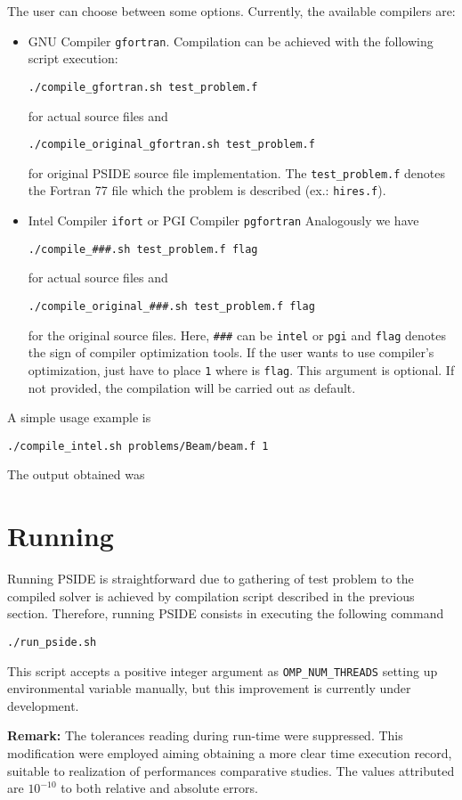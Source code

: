 \documentclass[a4paper,11pt]{article}
\theoremstyle{comm}
\begin{document}
The user can choose between some options. Currently, the available compilers are:
\begin{itemize}
\item GNU Compiler \texttt{gfortran}. Compilation can be achieved with the following script execution:

\begin{Verbatim}[frame=single]
./compile_gfortran.sh test_problem.f
\end{Verbatim}
for actual source files and
\begin{Verbatim}[frame=single]
./compile_original_gfortran.sh test_problem.f
\end{Verbatim}
for original PSIDE source file implementation. The \texttt{test\_problem.f} denotes the Fortran 77 file which the problem is described (ex.: \texttt{hires.f}).

\item Intel Compiler \texttt{ifort} or PGI Compiler \texttt{pgfortran} Analogously we have

\begin{Verbatim}[frame=single]
./compile_###.sh test_problem.f flag
\end{Verbatim}
for actual source files and
\begin{Verbatim}[frame=single]
./compile_original_###.sh test_problem.f flag
\end{Verbatim}
for the original source files. Here, \texttt{\#\#\#} can be \texttt{intel} or \texttt{pgi} and \texttt{flag} denotes the sign of compiler optimization tools. If the user wants to use compiler's optimization, just have to place \texttt{1} where is \texttt{flag}. This argument is optional. If not provided, the compilation will be carried out as default.

\end{itemize}

A simple usage example is
\begin{Verbatim}[frame=single]
./compile_intel.sh problems/Beam/beam.f 1
\end{Verbatim}

The output obtained was


\section{Running}

Running PSIDE is straightforward due to gathering of test problem to the compiled solver is achieved by compilation script described in the previous section. Therefore, running PSIDE consists in executing the following command
\begin{Verbatim}[frame=single]
./run_pside.sh
\end{Verbatim}

This script accepts a positive integer argument as 
\texttt{OMP\_NUM\_THREADS} 
setting up environmental variable manually, but this improvement is currently under development.

\textbf{Remark:} The tolerances reading during run-time were suppressed. This modification were employed aiming obtaining a more clear time execution record, suitable to realization of performances comparative studies. The values attributed are $10^{-10}$ to both relative and absolute errors.
\end{document}
